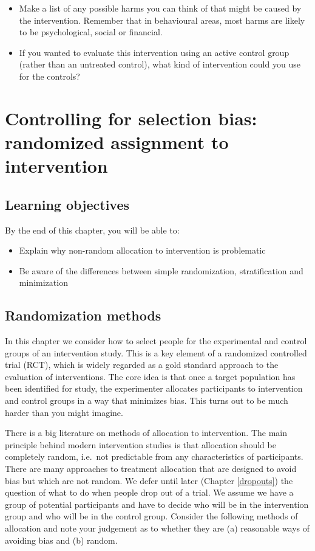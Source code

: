 \documentclass{krantz}
\providecommand{\tightlist}{%
\setlength{\itemsep}{0pt}\setlength{\parskip}{0pt}}
\begin{document}
\begin{itemize}
\tightlist
\item
  Make a list of any possible harms you can think of that might be caused by the intervention. Remember that in behavioural areas, most harms are likely to be psychological, social or financial.
\item
  If you wanted to evaluate this intervention using an active control group (rather than an untreated control), what kind of intervention could you use for the controls?
\end{itemize}

\hypertarget{randomize}{%
\chapter{Controlling for selection bias: randomized assignment to intervention}\label{randomize}}

\hypertarget{learning-objectives-6}{%
\section{Learning objectives}\label{learning-objectives-6}}

By the end of this chapter, you will be able to:

\begin{itemize}
\item
  Explain why non-random allocation to intervention is problematic
\item
  Be aware of the differences between simple randomization, stratification and minimization
\end{itemize}

\hypertarget{randomization-methods}{%
\section{Randomization methods}\label{randomization-methods}}

In this chapter we consider how to select people for the experimental and control groups of an intervention study. This is a key element of a randomized controlled trial (RCT), which is widely regarded as a gold standard approach to the evaluation of interventions. The core idea is that once a target population has been identified for study, the experimenter allocates participants to intervention and control groups in a way that minimizes bias. This turns out to be much harder than you might imagine.

There is a big literature on methods of allocation to intervention. The main principle behind modern intervention studies is that allocation should be completely random, i.e.~not predictable from any characteristics of participants. There are many approaches to treatment allocation that are designed to avoid bias but which are not random. We defer until later (Chapter \ref{dropouts}) the question of what to do when people drop out of a trial. We assume we have a group of potential participants and have to decide who will be in the intervention group and who will be in the control group. Consider the following methods of allocation and note your judgement as to whether they are (a) reasonable ways of avoiding bias and (b) random.
\end{document}
